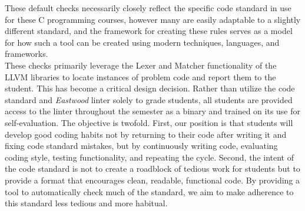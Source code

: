 \documentclass[sigconf]{acmart}
\begin{document}
These default checks necessarily closely reflect the specific code standard in use for
these C programming courses, however many are easily adaptable to a slightly different
standard, and the framework for creating these rules serves as a model for how such a
tool can be created using modern techniques, languages, and frameworks. \\

These checks primarily leverage the Lexer and Matcher functionality of the LLVM libraries
to locate instances of problem code and report them to the student. This has become a
critical design decision. Rather than utilize the code standard and \textit{Eastwood}
linter solely to grade students, all students are provided access to the linter
throughout the semester as a binary and trained on its use for self-evaluation.
The objective is twofold. First, our position is that students will develop good coding
habits not by returning to their code after writing it and fixing code standard
mistakes, but by continuously writing code, evaluating coding style, testing
functionality, and repeating the cycle. Second, the intent of the code standard is not
to create a roadblock of tedious work for students but to provide a format that
encourages clean, readable, functional code. By providing a tool to automatically check
much of the standard, we aim to make adherence to this standard less tedious and more
habitual.
\\
\end{document}
